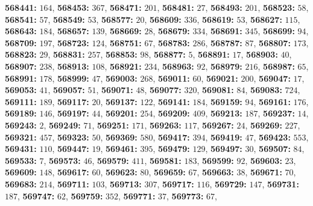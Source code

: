 \textsf{\bfseries 568441:} $164$, \textsf{\bfseries 568453:} $367$, \textsf{\bfseries 568471:} $201$, \textsf{\bfseries 568481:} $27$, \textsf{\bfseries 568493:} $201$, \textsf{\bfseries 568523:} $58$, \textsf{\bfseries 568541:} $57$, \textsf{\bfseries 568549:} $53$, \textsf{\bfseries 568577:} $20$, \textsf{\bfseries 568609:} $336$, \textsf{\bfseries 568619:} $53$, \textsf{\bfseries 568627:} $115$, \textsf{\bfseries 568643:} $184$, \textsf{\bfseries 568657:} $139$, \textsf{\bfseries 568669:} $28$, \textsf{\bfseries 568679:} $334$, \textsf{\bfseries 568691:} $345$, \textsf{\bfseries 568699:} $94$, \textsf{\bfseries 568709:} $197$, \textsf{\bfseries 568723:} $124$, \textsf{\bfseries 568751:} $67$, \textsf{\bfseries 568783:} $286$, \textsf{\bfseries 568787:} $87$, \textsf{\bfseries 568807:} $173$, \textsf{\bfseries 568823:} $29$, \textsf{\bfseries 568831:} $257$, \textsf{\bfseries 568853:} $98$, \textsf{\bfseries 568877:} $5$, \textsf{\bfseries 568891:} $17$, \textsf{\bfseries 568903:} $40$, \textsf{\bfseries 568907:} $238$, \textsf{\bfseries 568913:} $108$, \textsf{\bfseries 568921:} $234$, \textsf{\bfseries 568963:} $92$, \textsf{\bfseries 568979:} $216$, \textsf{\bfseries 568987:} $65$, \textsf{\bfseries 568991:} $178$, \textsf{\bfseries 568999:} $47$, \textsf{\bfseries 569003:} $268$, \textsf{\bfseries 569011:} $60$, \textsf{\bfseries 569021:} $200$, \textsf{\bfseries 569047:} $17$, \textsf{\bfseries 569053:} $41$, \textsf{\bfseries 569057:} $51$, \textsf{\bfseries 569071:} $48$, \textsf{\bfseries 569077:} $320$, \textsf{\bfseries 569081:} $84$, \textsf{\bfseries 569083:} $724$, \textsf{\bfseries 569111:} $189$, \textsf{\bfseries 569117:} $20$, \textsf{\bfseries 569137:} $122$, \textsf{\bfseries 569141:} $184$, \textsf{\bfseries 569159:} $94$, \textsf{\bfseries 569161:} $176$, \textsf{\bfseries 569189:} $146$, \textsf{\bfseries 569197:} $44$, \textsf{\bfseries 569201:} $254$, \textsf{\bfseries 569209:} $409$, \textsf{\bfseries 569213:} $187$, \textsf{\bfseries 569237:} $14$, \textsf{\bfseries 569243:} $2$, \textsf{\bfseries 569249:} $71$, \textsf{\bfseries 569251:} $171$, \textsf{\bfseries 569263:} $117$, \textsf{\bfseries 569267:} $24$, \textsf{\bfseries 569269:} $227$, \textsf{\bfseries 569321:} $457$, \textsf{\bfseries 569323:} $50$, \textsf{\bfseries 569369:} $580$, \textsf{\bfseries 569417:} $394$, \textsf{\bfseries 569419:} $47$, \textsf{\bfseries 569423:} $553$, \textsf{\bfseries 569431:} $110$, \textsf{\bfseries 569447:} $19$, \textsf{\bfseries 569461:} $395$, \textsf{\bfseries 569479:} $129$, \textsf{\bfseries 569497:} $30$, \textsf{\bfseries 569507:} $84$, \textsf{\bfseries 569533:} $7$, \textsf{\bfseries 569573:} $46$, \textsf{\bfseries 569579:} $411$, \textsf{\bfseries 569581:} $183$, \textsf{\bfseries 569599:} $92$, \textsf{\bfseries 569603:} $23$, \textsf{\bfseries 569609:} $148$, \textsf{\bfseries 569617:} $60$, \textsf{\bfseries 569623:} $80$, \textsf{\bfseries 569659:} $67$, \textsf{\bfseries 569663:} $38$, \textsf{\bfseries 569671:} $70$, \textsf{\bfseries 569683:} $214$, \textsf{\bfseries 569711:} $103$, \textsf{\bfseries 569713:} $307$, \textsf{\bfseries 569717:} $116$, \textsf{\bfseries 569729:} $147$, \textsf{\bfseries 569731:} $187$, \textsf{\bfseries 569747:} $62$, \textsf{\bfseries 569759:} $352$, \textsf{\bfseries 569771:} $37$, \textsf{\bfseries 569773:} $67$, 
